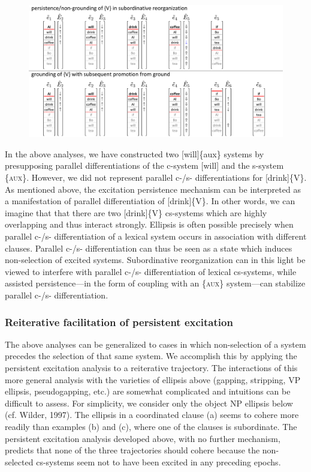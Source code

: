   
\begin{figure}
\includegraphics[width=\textwidth]{figures/Tilsen-img149.png}
\caption{\missingcaption}
\label{fig:}
\end{figure}
 

  In the above analyses, we have constructed two [will]\{aux\} systems by presupposing parallel differentiations of the c-system [will] and the s-system \{\textsc{aux}\}. However, we did not represent parallel c-/s- differentiations for [drink]\{V\}. As mentioned above, the excitation persistence mechanism can be interpreted as a manifestation of parallel differentiation of [drink]\{V\}. In other words, we can imagine that that there are two [drink]\{V\} cs-systems which are highly overlapping and thus interact strongly. Ellipsis is often possible precisely when parallel c-/s- differentiation of a lexical system occurs in association with different clauses. Parallel c-/s- differentiation can thus be seen as a state which induces non-selection of excited systems. Subordinative reorganization can in this light be viewed to interfere with parallel c-/s- differentiation of lexical cs-systems, while assisted persistence—in the form of coupling with an \{\textsc{aux}\} system—can stabilize parallel c-/s- differentiation.

\subsubsection{Reiterative facilitation of persistent excitation}

The above analyses can be generalized to cases in which non-selection of a system precedes the selection of that same system. We accomplish this by applying the persistent excitation analysis to a reiterative trajectory. The interactions of this more general analysis with the varieties of ellipsis above (gapping, stripping, VP ellipsis, pseudogapping, etc.) are somewhat complicated and intuitions can be difficult to assess. For simplicity, we consider only the object NP ellipsis below (cf. Wilder, 1997). The ellipsis in a coordinated clause (a) seems to cohere more readily than examples (b) and (c), where one of the clauses is subordinate. The persistent excitation analysis developed above, with no further mechanism, predicts that none of the three trajectories should cohere because the non-selected cs-systems seem not to have been excited in any preceding epochs.


